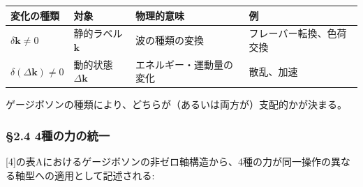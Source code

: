 \documentclass[
  a4paper,11pt]{ltjsarticle}
\newcounter{none}
\theoremstyle{definition}
\theoremstyle{remark}
\begin{document}
{\def\LTcaptype{none} %
\begin{longtable}[]{@{}
  >{\raggedright\arraybackslash}p{}
  >{\raggedright\arraybackslash}p{}
  >{\raggedright\arraybackslash}p{}
  >{\raggedright\arraybackslash}p{}@{}}
\toprule\noalign{}
\begin{minipage}[b]{\linewidth}\raggedright
変化の種類
\end{minipage} & \begin{minipage}[b]{\linewidth}\raggedright
対象
\end{minipage} & \begin{minipage}[b]{\linewidth}\raggedright
物理的意味
\end{minipage} & \begin{minipage}[b]{\linewidth}\raggedright
例
\end{minipage} \\
\midrule\noalign{}
\endhead
\bottomrule\noalign{}
\endlastfoot
\(\delta\mathbf{k} \neq 0\) & 静的ラベル \(\mathbf{k}\) & 波の種類の変換
& フレーバー転換、色荷交換 \\
\(\delta(\Delta\mathbf{k}) \neq 0\) & 動的状態 \(\Delta\mathbf{k}\) &
エネルギー・運動量の変化 & 散乱、加速 \\
\end{longtable}
}

ゲージボソンの種類により、どちらが（あるいは両方が）支配的かが決まる。

\subsubsection{§2.4
4種の力の統一}\label{ux7a2eux306eux529bux306eux7d71ux4e00}

{[}4{]}の表Aにおけるゲージボソンの非ゼロ軸構造から、4種の力が同一操作の異なる軸型への適用として記述される:
\end{document}
